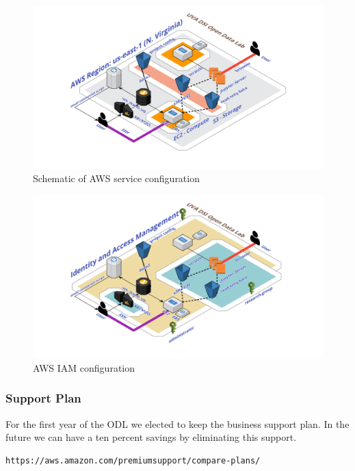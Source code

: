 \begin{figure}[!hbtp]
\includegraphics[width=\textwidth]{images/odl-diagram.png}
\caption{Schematic of AWS service  configuration\label{fg:aws}}
\end{figure}
\begin{figure}[!hbtp]
\includegraphics[width=\textwidth]{images/odl-iam.png}
\caption{AWS IAM configuration\label{fg:iam}}
\end{figure}



\subsubsection{Support Plan}
For the first year of the ODL we elected to keep the business support plan. In the future we can have a ten percent savings by eliminating this support.
\begin{verbatim}
https://aws.amazon.com/premiumsupport/compare-plans/
\end{verbatim}

